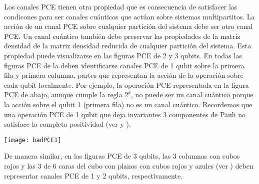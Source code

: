 Los canales PCE tienen otra propiedad que es consecuencia de satisfacer 
las condicones para ser canales cuánticos que actúan sobre sistemas 
multipartitos. La acción de un canal PCE sobre cualquier partición del sistema debe 
ser otro canal PCE. Un canal cuántico también debe preservar las propiedades
de la matriz densidad de la matriz densidad reducida de cualquier
partición del sistema. Esta propiedad puede visualizarse en las figuras PCE
de 2 y 3 qubits. En todas las figuras PCE
de la  deben identificarse canales PCE de 1 qubit 
sobre la primera fila y primera columna, partes que representan la acción de
la operación sobre cada qubit localmente. Por ejemplo, la operación PCE 
representada en la figura PCE de abajo, aunque 
cumple la regla $2^k$, no puede ser un canal cuántico porque la acción 
sobre el qubit 1 (primera fila) no es un canal cuántico. Recordemos que 
una operación PCE de 1 qubit que deja invariantes 3 componentes de Pauli
no satisface la completa positividad (ver  y ).
\begin{center}
	\texttt{[image: badPCE1]}
\end{center}
De manera similar, en las figuras PCE de 3 qubits, las 3 columnas con cubos rojos y
las 3 de 6 caras del cubo con planos con cubos rojos y azules (ver )
deben representar
canales PCE de 1 y 2 qubits, respectivamente. 


